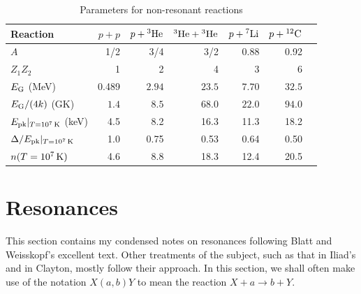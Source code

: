 \begin{table}[htbp]
\caption{\label{t.reaction} Parameters for non-resonant reactions}
\begin{center}
\begin{tabular}{lrrrrrr}
\hline
Reaction & $p+p$ & $p+\helium[3]$ & $\helium[3]+\helium[3]$ & $p+\lithium[7]$ & $p+\carbon$\\
\hline\hline
$A$ & 1/2 & 3/4 & 3/2 & 0.88 & 0.92 \\
$Z_{1}Z_{2}$ & 1 & 2 & 4 & 3 & 6 \\
$\EG$ (MeV) & 0.489 & $2.94$ & $23.5$ & $7.70$ & $32.5$\\
$\EG/(4k)$ (GK) & $1.4$ & $8.5$ & $68.0$ & $22.0$ & $94.0$ \\
$\Epk|_{T=10^{7}\nsp\K}$ (keV) & 4.5 & 8.2 & 16.3 & 11.3 & 18.2\\
$\Delta/\Epk|_{T=10^{7}\nsp\K}$ & 1.0 & 0.75 & 0.53 & 0.64 & 0.50 \\
$n(T = 10^{7}\nsp\K)$ & 4.6 & 8.8 & 18.3 & 12.4 & 20.5\\
\hline
\end{tabular}
\end{center}
\end{table}
%

\section{Resonances}\label{s.resonant-reactions}

This section contains my condensed notes on resonances following Blatt and Weisskopf's excellent text.  Other treatments of the subject, such as that in Iliad's and in Clayton, mostly follow their approach. In this section, we shall often make use of the notation $X(a,b)Y$ to mean the reaction $X + a \to b + Y$.

